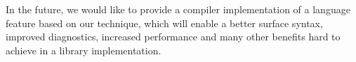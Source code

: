 
In the future, we would like to provide a compiler implementation of a language feature based on our 
technique, which will enable a better surface syntax, improved diagnostics, 
increased performance and many other benefits hard to achieve in a library 
implementation.

%
%
%
%
%